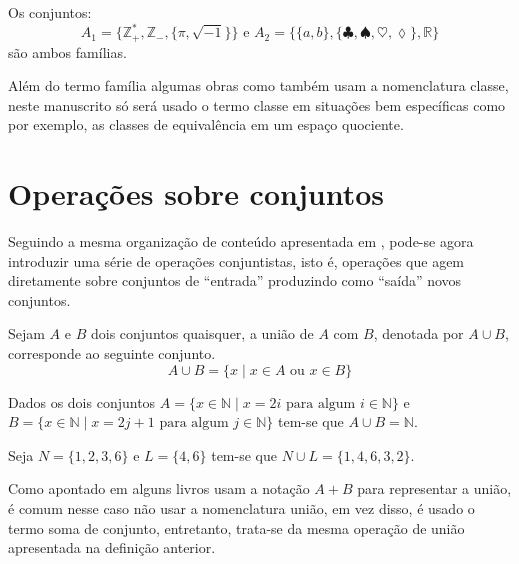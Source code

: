 \begin{example}\label{exe:Familia}
	Os conjuntos: 
	$$A_1 = \{\mathbb{Z}^*_+, \mathbb{Z}_-, \{\pi, \sqrt{-1}\}\} \mbox{ e } A_2 = \{\{a, b\}, \{\clubsuit, \spadesuit, \heartsuit, \lozenge\}, \mathbb{R}\}$$
	são ambos famílias.
\end{example}

\begin{remark}
	Além do termo família algumas obras como \cite{lipschutz1978-TC} também usam a nomenclatura classe, neste manuscrito só será usado o termo classe em situações bem específicas como por exemplo, as classes de equivalência em um espaço quociente.
\end{remark}

\section{Operações sobre conjuntos}\label{sec:OperacoesConjuntos}

Seguindo a mesma organização de conteúdo apresentada em \cite{lipschutz2013-MD}, pode-se agora introduzir uma série de operações conjuntistas, isto é, operações que agem diretamente sobre conjuntos de ``entrada'' produzindo como ``saída'' novos conjuntos.

\begin{definition}\label{def:UniaoConjuntos}
	Sejam $A$ e $B$ dois conjuntos quaisquer, a união de $A$ com $B$, denotada por $A \cup B$, corresponde ao seguinte conjunto.
	$$A \cup B = \{x \mid x \in A \mbox{ ou } x \in B\}$$
\end{definition}

\begin{example}\label{exe:UniaoDeConjuntos1}
	Dados os dois conjuntos $A = \{x \in \mathbb{N} \mid x = 2i \mbox{ para algum } i \in \mathbb{N}\}$ e $B = \{x \in \mathbb{N} \mid x = 2j + 1 \mbox{ para algum } j \in \mathbb{N}\}$ tem-se que $A \cup B = \mathbb{N}$.
\end{example}

\begin{example}\label{exe:UniaoDeConjuntos2}
	Seja $N = \{1, 2, 3, 6\}$ e $L = \{4, 6\}$ tem-se que $N \cup L = \{1, 4, 6, 3, 2\}$.
\end{example}

Como apontado em \cite{lipschutz1978-TC} alguns livros usam a notação $A + B$ para representar a união, é comum nesse caso não usar a nomenclatura união, em vez disso, é usado o termo soma de conjunto, entretanto, trata-se da mesma operação de união apresentada na definição anterior.

